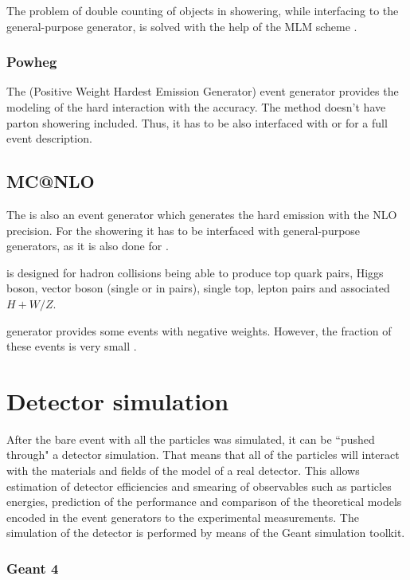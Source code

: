 The problem of double counting of objects in showering, while interfacing \MG to the general-purpose generator, is solved with the help of the 
MLM scheme \cite{Mrenna:2003if}.

\subsubsection{Powheg}

The \Powheg (Positive Weight Hardest Emission Generator) event generator \cite{Frixione:2007vw} provides the modeling of the hard interaction 
with the accuracy. The \Powheg method doesn't have parton showering included. Thus, it has to be also interfaced with \PYTHIA or
\HERWIG for a full event description.

\subsection{MC@NLO}

The \MCNLO \cite{Frixione:2002ik} is also an event generator which generates the hard emission with the NLO precision. For the showering
it has to be interfaced with general-purpose generators, as it is also done for \Powheg. 

\MCNLO is designed for hadron collisions being able to produce top quark pairs, Higgs boson, vector boson (single or in pairs), single top,
lepton pairs and associated $H+W/Z$.

\MCNLO generator provides some events with negative weights. However, the fraction of these events is very small \cite{Frixione:2002ik}.


\section{Detector simulation}

After the bare event with all the particles was simulated, it can be ``pushed through" a detector simulation. That means that all of the particles 
will interact with the materials and fields of the model of a real detector. This allows estimation of 
detector efficiencies and smearing of observables such as particles energies, prediction of the performance and comparison of the theoretical 
models encoded in the event generators to
the experimental measurements. The simulation of the detector is performed by means of the Geant simulation toolkit.

\subsubsection{Geant 4}

